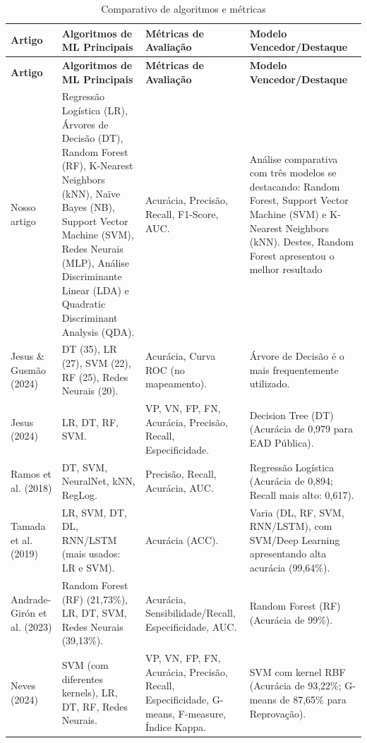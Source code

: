 \documentclass[english, spanish, brazilian]{RBIEarticle} %
\begin{document}
\begin{longtable}{|p{3cm}|p{3.5cm}|p{4.5cm}|p{5cm}|}
    \caption{Comparativo de algoritmos e métricas}\\
    \toprule
    \textbf{Artigo} & \textbf{Algoritmos de ML Principais} & \textbf{Métricas de Avaliação} & \textbf{Modelo Vencedor/Destaque} \\
    \midrule
    \endfirsthead
    \toprule
    \textbf{Artigo} & \textbf{Algoritmos de ML Principais} & \textbf{Métricas de Avaliação} & \textbf{Modelo Vencedor/Destaque} \\
    \midrule
    \endhead
    Nosso artigo & Regressão Logística (LR), Árvores de Decisão (DT), Random Forest (RF), K-Nearest Neighbors (kNN), Naïve Bayes (NB), Support Vector Machine (SVM), Redes Neurais (MLP), Análise Discriminante Linear (LDA) e Quadratic Discriminant Analysis (QDA). & Acurácia, Precisão, Recall, F1-Score, AUC. & Análise comparativa com três modelos se destacando: Random Forest, Support Vector Machine (SVM) e K-Nearest Neighbors (kNN). Destes, Random Forest apresentou o melhor resultado \\ \hline
    
    Jesus \& Gusmão (2024) & DT (35), LR (27), SVM (22), RF (25), Redes Neurais (20). & Acurácia, Curva ROC (no mapeamento). & Árvore de Decisão é o mais frequentemente utilizado. \\ \hline
    
    Jesus (2024) & LR, DT, RF, SVM. & VP, VN, FP, FN, Acurácia, Precisão, Recall, Especificidade. & Decision Tree (DT) (Acurácia de 0,979 para EAD Pública). \\ \hline
    
    Ramos et al. (2018) & DT, SVM, NeuralNet, kNN, RegLog. & Precisão, Recall, Acurácia, AUC. & Regressão Logística (Acurácia de 0,894; Recall mais alto: 0,617). \\ \hline
    
    Tamada et al. (2019) & LR, SVM, DT, DL, RNN/LSTM (mais usados: LR e SVM). & Acurácia (ACC). & Varia (DL, RF, SVM, RNN/LSTM), com SVM/Deep Learning apresentando alta acurácia (99,64\%). \\ \hline
    
    Andrade-Girón et al. (2023) & Random Forest (RF) (21,73\%), LR, DT, SVM, Redes Neurais (39,13\%). & Acurácia, Sensibilidade/Recall, Especificidade, AUC. & Random Forest (RF) (Acurácia de 99\%). \\ \hline
    
    Neves (2024) & SVM (com diferentes kernels), LR, DT, RF, Redes Neurais. & VP, VN, FP, FN, Acurácia, Precisão, Recall, Especificidade, G-means, F-measure, Índice Kappa. & SVM com kernel RBF (Acurácia de 93,22\%; G-means de 87,65\% para Reprovação). \\ 
    \bottomrule
\end{longtable}
\end{document}
